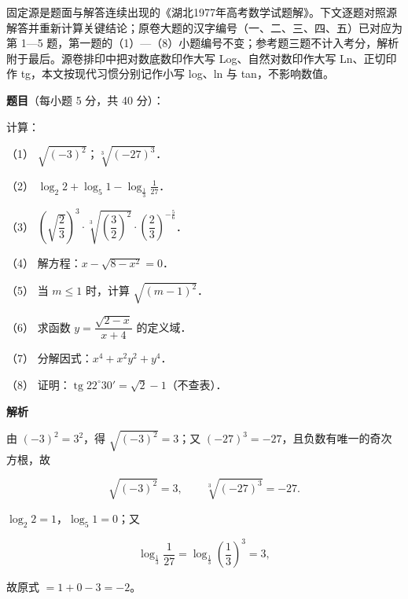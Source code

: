 

\begin{gktip}
固定源是题面与解答连续出现的《湖北1977年高考数学试题解》。下文逐题对照源解答并重新计算关键结论；原卷大题的汉字编号（一、二、三、四、五）已对应为第 1—5 题，第一题的（1）—（8）小题编号不变；参考题三题不计入考分，解析附于最后。源卷排印中把对数底数印作大写 Log、自然对数印作大写 Ln、正切印作 tg，本文按现代习惯分别记作小写 log、ln 与 tan，不影响数值。
\end{gktip}

\begin{answer}

\textbf{题目}（每小题 5 分，共 40 分）：

计算：

（1） $\sqrt{(-3)^2}$；$\sqrt[3]{(-27)^3}$．

（2） $\log_2 2+\log_5 1-\log_{\frac13}\frac{1}{27}$．

（3） $\left(\sqrt{\dfrac23}\right)^3\cdot\sqrt[3]{\left(\dfrac32\right)^2}\cdot\left(\dfrac23\right)^{-\frac56}$．

（4） 解方程：$x-\sqrt{8-x^2}=0$．

（5） 当 $m\leqslant 1$ 时，计算 $\sqrt{(m-1)^2}$．

（6） 求函数 $y=\dfrac{\sqrt{2-x}}{x+4}$ 的定义域．

（7） 分解因式：$x^4+x^2y^2+y^4$．

（8） 证明：$\operatorname{tg}22^\circ30'=\sqrt2-1$（不查表）．

\textbf{解析}


由 $(-3)^2=3^2$，得 $\sqrt{(-3)^2}=3$；又 $(-27)^3=-27$，且负数有唯一的奇次方根，故

\nopagebreak[4]
\[
\sqrt{(-3)^2}=3,
\qquad
\sqrt[3]{(-27)^3}=-27.
\]


$\log_2 2=1$，$\log_5 1=0$；又

\nopagebreak[4]
\[
\log_{\frac13}\frac{1}{27}
=\log_{\frac13}\left(\frac13\right)^{3}=3,
\]

故原式 $=1+0-3=-2$。



\end{answer}
